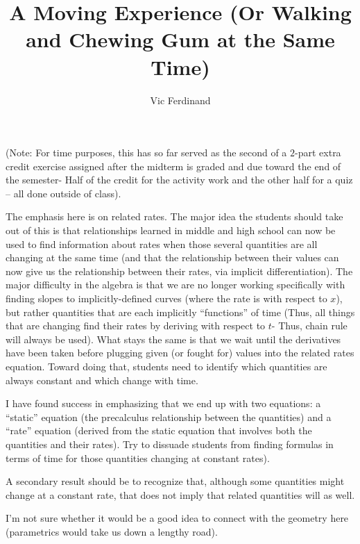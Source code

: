\documentclass[handout]{ximera}
\author{Vic Ferdinand}
\title{A Moving Experience (Or Walking and Chewing Gum at the Same Time)}
\begin{document}
\begin{abstract}
\end{abstract}
\maketitle

\begin{instructorIntro}
(Note: For time purposes, this has so far served as the second of a $2$-part extra credit exercise assigned after the midterm is graded and due toward the end of the semester- Half of the credit for the activity work and the other half for a quiz – all done outside of class).

The emphasis here is on related rates.  The major idea the students should take out of this is that relationships learned in middle and high school can now be used to find information about rates when those several quantities are all changing at the same time (and that the relationship between their values can now give us the relationship between their rates, via implicit differentiation).  The major difficulty in the algebra is that we are no longer working specifically with finding slopes to implicitly-defined curves (where the rate is with respect to $x$), but rather quantities that are each implicitly ``functions'' of time (Thus, all things that are changing find their rates by deriving with respect to $t$- Thus, chain rule will always be used).  What stays the same is that we wait until the derivatives have been taken before plugging given (or fought for) values into the related rates equation.  Toward doing that, students need to identify which quantities are always constant and which change with time.  

I have found success in emphasizing that we end up with two equations:  a ``static'' equation (the precalculus relationship between the quantities) and a ``rate'' equation (derived from the static equation that involves both the quantities and their rates).  Try to dissuade students from finding formulas in terms of time for those quantities changing at constant rates).

A secondary result should be to recognize that, although some quantities might change at a constant rate, that does not imply that related quantities will as well.

I'm not sure whether it would be a good idea to connect with the geometry here (parametrics would take us down a lengthy road).

\end{instructorIntro}
\end{document}
